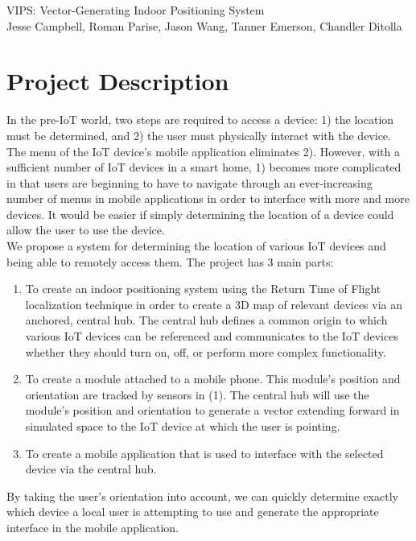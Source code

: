 \documentclass{article}
\begin{document}
\begin{center}
{\Large VIPS: Vector-Generating Indoor Positioning System} \\
{\small Jesse Campbell, Roman Parise, Jason Wang, Tanner Emerson, Chandler Ditolla}
\end{center}
\section{Project Description}
In the pre-IoT world, two steps are required to access a device: 1) the location must be determined, and 2) the user must physically interact with the device.
The menu of the IoT device's mobile application eliminates 2).
However, with a sufficient number of IoT devices in a smart home, 1) becomes more complicated in that users are beginning to have to navigate through an ever-increasing number of menus in mobile applications in order to interface with more and more devices.
It would be easier if simply determining the location of a device could allow the user to use the device. \\

We propose a system for determining the location of various IoT devices and being able to remotely access them.
The project has $3$ main parts: \\

\begin{enumerate}
\item To create an indoor positioning system using the Return Time of Flight localization technique in order to create a 3D map of relevant devices via an anchored, central hub. The central hub defines a common origin to which various IoT devices can be referenced and communicates to the IoT devices whether they should turn on, off, or perform more complex functionality. \\
\item To create a module attached to a mobile phone. This module's position and orientation are tracked by sensors in (1). The central hub will use the module's position and orientation to generate a vector extending forward in simulated space to the IoT device at which the user is pointing. \\
\item To create a mobile application that is used to interface with the selected device via the central hub. \\
\end{enumerate}

By taking the user’s orientation into account, we can quickly determine exactly which device a local user is attempting to use and generate the appropriate interface in the mobile application.
\end{document}
